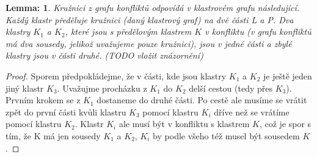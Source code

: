 \documentclass[12pt,a4report]{report}
\newtheorem{lemma}{Lemma: }[chapter]
\begin{document}
\begin{lemma}
Kružnici z grafu konfliktů odpovídá v klastrovém grafu následující. Každý klastr předěluje kružnici (daný klastrový graf) na dvě části L a P. Dva klastry $K_1$ a $K_2$, které jsou s předělovým klastrem $K$ v konfliktu (v grafu konfliktů má dva sousedy, jelikož uvažujeme pouze kružnici), jsou v jedné části a zbylé klastry jsou v části druhé. (TODO vložit znázornění)
\end{lemma}
\begin{proof}
Sporem předpokládejme, že v části, kde jsou klastry $K_1$ a $K_2$ je ještě jeden jiný klastr $K_3$. Uvažujme procházku z $K_1$ do $K_2$ delší cestou (tedy přes $K_3$). Prvním krokem se z $K_1$ dostaneme do druhé části. Po cestě ale musíme se vrátit zpět do první části kvůli klastru $K_3$ pomocí klastru $K_i$ dříve než se vrátíme pomocí klastru $K_2$. Klastr $K_i$ ale musí být v konfliktu s klastrem $K$, což je spor s tím, že K má jen sousedy $K_1$ a $K_2$, $K_i$ by podle všeho též musel být sousedem $K$. 
\end{proof}
\end{document}
